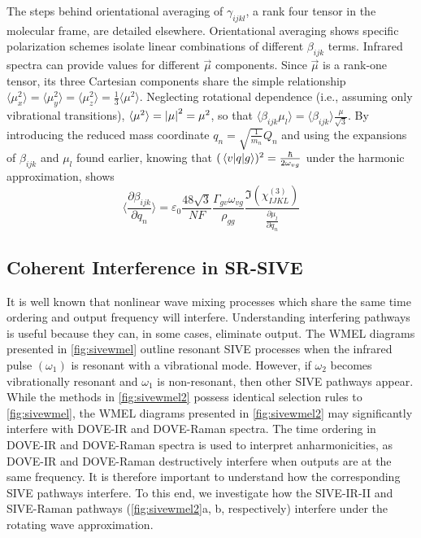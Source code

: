 \documentclass[aip, jcp, draft, onecolumn]{revtex4-2}
\begin{document}
The steps behind orientational averaging of $\gamma_{ijkl}$, a rank four tensor in the molecular frame, are detailed elsewhere.\cite{Andrews1977, McDonnell2024}
Orientational averaging shows specific polarization schemes isolate linear combinations of different $\beta_{ijk}$ terms. 
Infrared spectra can provide values for different $\vec{\mu}$ components.
Since $\vec{\mu}$ is a rank-one tensor, its three Cartesian components share the simple relationship $\langle {\mu^2_x} \rangle = \langle {\mu^2_y} \rangle = \langle {\mu^2_z} \rangle = \frac{1}{3}\langle {\mu^2} \rangle$. \cite{RN459}
Neglecting rotational dependence (i.e., assuming only vibrational transitions), $\langle {\mu^2} \rangle = \abs{\mu}^2 = \mu^2$, so that $\langle \beta_{ijk} \mu_l \rangle = \langle \beta_{ijk} \rangle \frac{\mu}{\sqrt{3}}$.
By introducing the reduced mass coordinate $q_n = \sqrt{\frac{1}{m_n}} Q_n$ and using the expansions of $\beta_{ijk}$ and $\mu_{l}$ found earlier, knowing that $(\mel{v}{q}{g})^2 = \frac{\hbar}{2\omega_{vg}}$ under the harmonic approximation, shows
\begin{equation}\label{betasive}
	\langle \frac{\partial \beta_{ijk}}{\partial q_n} \rangle = \varepsilon_0 \frac{48 \sqrt{3} }{NF}  \frac{\Gamma_{gv} \omega_{vg}}{\rho_{gg}} \frac{\Im(\chi^{(3)}_{IJKL})}{\frac{\partial \mu_{l}}{\partial q_n}}
\end{equation}



\subsection{Coherent Interference in SR-SIVE}
It is well known that nonlinear wave mixing processes which share the same time ordering and output frequency will interfere. \cite{RN135, Bonn2024}
Understanding interfering pathways is useful because they can, in some cases, eliminate output. \cite{RN342, RN135}
The WMEL diagrams presented in \autoref{fig:sivewmel} outline resonant SIVE processes when the infrared pulse $(\omega_1)$ is resonant with a vibrational mode. 
However, if $\omega_2$ becomes vibrationally resonant and $\omega_1$ is non-resonant, then other SIVE pathways appear.\cite{McDonnell2024} 
While the methods in \autoref{fig:sivewmel2} possess identical selection rules to \autoref{fig:sivewmel}, the WMEL diagrams presented in \autoref{fig:sivewmel2} may significantly interfere with DOVE-IR and DOVE-Raman spectra.
The time ordering in DOVE-IR and DOVE-Raman spectra is used to interpret anharmonicities, as DOVE-IR and DOVE-Raman destructively interfere when outputs are at the same frequency. \cite{RN135, RN324}
It is therefore important to understand how the corresponding SIVE pathways interfere.
To this end, we investigate how the SIVE-IR-II and SIVE-Raman pathways (\autoref{fig:sivewmel2}a, b, respectively) interfere under the rotating wave approximation. 
\end{document}
